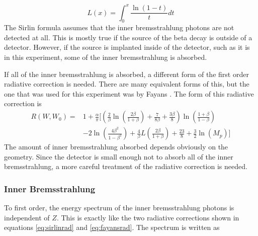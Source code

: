 \documentclass[../MaxHughesThesis.tex]{subfiles}
\begin{document}
\begin{equation}
	L(x) = \int_{0}^{x} \frac{\ln(1 - t)}{t}dt
	\label{eq:spence}
\end{equation}
The Sirlin formula assumes that the inner bremsstrahlung photons are not detected at all.
This is mostly true if the source of the beta decay is outside of a detector.
However, if the source is implanted inside of the detector, such as it is in this experiment, some of the inner bremsstrahlung is absorbed.

If all of the inner bremsstrahlung is absorbed, a different form of the first order radiative correction is needed.
There are many equivalent forms of this, but the one that was used for this experiment was by Fayans \cite{Fay86}.
The form of this radiative correction is %
\begin{equation}	
	\label{eq:fayansrad}
	\begin{split}
	R(W,W_{0}) = & 1 + \frac{\alpha}{\pi}[(\frac{2}{\beta}\ln \left( \frac{2\beta}{1+\beta} \right) + \frac{7}{8\beta} + \frac{3\beta}{8})\ln \left(\frac{1 + \beta}{1 - \beta} \right) \\
	& - 2\ln \left(\frac{4\beta^{2}}{1 - \beta^{2}}\right) + \frac{4}{\beta}L \left(\frac{2\beta}{1+\beta}\right) + \frac{23}{8} + \frac{3}{2}\ln(M_{p})]
	\end{split}
\end{equation}
The amount of inner bremsstrahlung absorbed depends obviously on the geometry.
Since the detector is small enough not to absorb all of the inner bremsstrahlung, a more careful treatment of the radiative correction is needed.

\subsubsection{Inner Bremsstrahlung}

To first order, the energy spectrum of the inner bremsstrahlung photons is independent of $Z$.
This is exactly like the two radiative corrections shown in equations \ref{eq:sirlinrad} and \ref{eq:fayansrad}. 
The spectrum is written as \cite{Kni36}%
\end{document}
